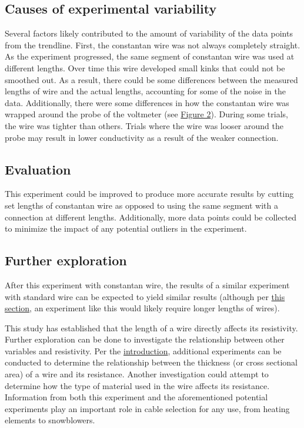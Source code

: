 \documentclass{article}
\begin{document}
\subsection{Causes of experimental variability}
\label{sec:error}

Several factors likely contributed to the amount of variability of the data points from the trendline. First, the constantan wire was not always completely straight. As the experiment progressed, the same segment of constantan wire was used at different lengths. Over time this wire developed small kinks that could not be smoothed out. As a result, there could be some differences between the measured lengths of wire and the actual lengths, accounting for some of the noise in the data. Additionally, there were some differences in how the constantan wire was wrapped around the probe of the voltmeter (see \hyperref[fig:wire]{Figure 2}). During some trials, the wire was tighter than others. Trials where the wire was looser around the probe may result in lower conductivity as a result of the weaker connection.

\subsection{Evaluation}

This experiment could be improved to produce more accurate results by cutting set lengths of constantan wire as opposed to using the same segment with a connection at different lengths. Additionally, more data points could be collected to minimize the impact of any potential outliers in the experiment.

\subsection{Further exploration}

After this experiment with constantan wire, the results of a similar experiment with standard wire can be expected to yield similar results (although per \hyperref[sec:wires]{this section}, an experiment like this would likely require longer lengths of wires).

This study has established that the length of a wire directly affects its resistivity. Further exploration can be done to investigate the relationship between other variables and resistivity. Per the \hyperref[sec:intro]{introduction}, additional experiments can be conducted to determine the relationship between the thickness (or cross sectional area) of a wire and its resistance. Another investigation could attempt to determine how the type of material used in the wire affects its resistance. Information from both this experiment and the aforementioned potential experiments play an important role in cable selection for any use, from heating elements to snowblowers. 



\end{document}
